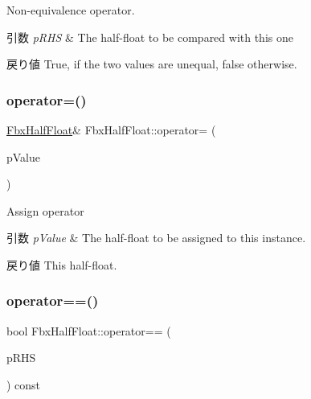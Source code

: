 Non-\/equivalence operator. 
\begin{DoxyParams}{引数}
{\em p\+R\+HS} & The half-\/float to be compared with this one \\
\hline
\end{DoxyParams}
\begin{DoxyReturn}{戻り値}
{\ttfamily True}, if the two values are unequal, {\ttfamily false} otherwise. 
\end{DoxyReturn}
\mbox{\label{class_fbx_half_float_a83e214aced2eacc47a1b0fd768e025a5}} 
\subsubsection{\texorpdfstring{operator=()}{operator=()}}
{\footnotesize\ttfamily \hyperlink{class_fbx_half_float}{Fbx\+Half\+Float}\& Fbx\+Half\+Float\+::operator= (\begin{DoxyParamCaption}\item[{const \hyperlink{class_fbx_half_float}{Fbx\+Half\+Float} \&}]{p\+Value }\end{DoxyParamCaption})}

Assign operator 
\begin{DoxyParams}{引数}
{\em p\+Value} & The half-\/float to be assigned to this instance. \\
\hline
\end{DoxyParams}
\begin{DoxyReturn}{戻り値}
This half-\/float. 
\end{DoxyReturn}
\mbox{\label{class_fbx_half_float_a2f0407870ed2ad08a2a97477acfcf193}} 
\subsubsection{\texorpdfstring{operator==()}{operator==()}}
{\footnotesize\ttfamily bool Fbx\+Half\+Float\+::operator== (\begin{DoxyParamCaption}\item[{const \hyperlink{class_fbx_half_float}{Fbx\+Half\+Float} \&}]{p\+R\+HS }\end{DoxyParamCaption}) const}

